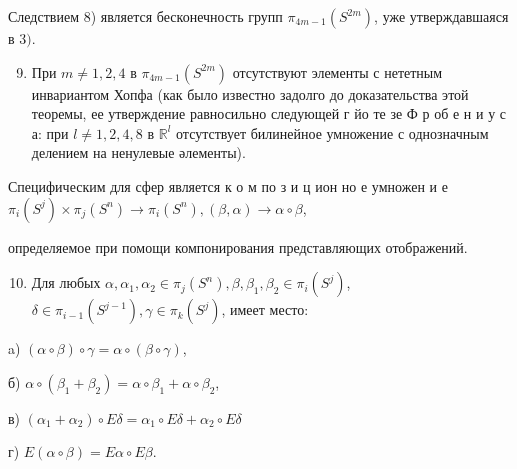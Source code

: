 \documentclass[10pt]{article}
\begin{document}
Следствием 8) является бесконечность групп $\pi_{4 m-1}\left(S^{2 m}\right)$, уже утверждавшаяся в 3$)$.



\begin{enumerate}

  \setcounter{enumi}{8}

  \item При $m \neq 1,2,4$ в $\pi_{4 m-1}\left(S^{2 m}\right)$ отсутствуют элементы с нететным инвариантом Хопфа (как было известно задолго до доказательства этой теоремы, ее утверждение равносильно следующей г йо те зе Ф р об е н и у с а: при $l \neq 1,2,4,8$ в $\mathbb{R}^{l}$ отсутствует билинейное умножение с однозначным делением на ненулевые әлементы).

\end{enumerate}



Специфическим для сфер является к о м по з и ц ион но е умножен и е $\pi_{i}\left(S^{j}\right) \times \pi_{j}\left(S^{n}\right) \longrightarrow \pi_{i}\left(S^{n}\right),(\beta, \alpha) \longrightarrow \alpha \circ \beta$,



определяемое при помощи компонирования представляющих отображений.



\begin{enumerate}

  \setcounter{enumi}{9}

  \item Для любых $\alpha, \alpha_{1}, \alpha_{2} \in \pi_{j}\left(S^{n}\right), \beta, \beta_{1}, \beta_{2} \in \pi_{i}\left(S^{j}\right)$, $\delta \in \pi_{i-1}\left(S^{j-1}\right), \gamma \in \pi_{k}\left(S^{j}\right)$, имеет место:

\end{enumerate}



a) $(\alpha \circ \beta) \circ \gamma=\alpha \circ(\beta \circ \gamma)$,



б) $\alpha \circ\left(\beta_{1}+\beta_{2}\right)=\alpha \circ \beta_{1}+\alpha \circ \beta_{2}$,



в) $\left(\alpha_{1}+\alpha_{2}\right) \circ E \delta=\alpha_{1} \circ E \delta+\alpha_{2} \circ E \delta$



г) $E(\alpha \circ \beta)=E \alpha \circ E \beta$.
\end{document}
